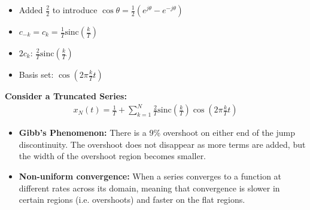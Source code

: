 \begin{example}
    \begin{itemize}
        \item Added \(\frac{2}{2}\) to introduce \(\cos\theta = \frac{1}{2} \left(e^{j \theta} - e^{-j \theta}\right) \)
        \item $c_{-k} = c_k = \frac{1}{T} \text{sinc} \left( \frac{k}{T} \right)$
        \item \(2c_k\): $\frac{2}{T} \text{sinc} \left( \frac{k}{T} \right)$
        \item Basis set: $\cos \left( 2\pi \frac{k}{T} t \right)$
    \end{itemize}
    \vspace{1em}
    
    \textbf{Consider a Truncated Series:}
    \begin{align*}
        x_N(t) = \frac{1}{T} + \sum_{k=1}^{N} \frac{2}{T} \text{sinc} \left( \frac{k}{T} \right) \cos \left( 2\pi \frac{k}{T} t \right)
    \end{align*}
    

    \begin{itemize}
        \item \textbf{Gibb's Phenomenon:} There is a 9\% overshoot on either end of the jump discontinuity. The overshoot does not disappear as more terms are added, but the width of the overshoot region becomes smaller.
        \item \textbf{Non-uniform convergence:} When a series converges to a function at different rates across its domain, meaning that convergence is slower in certain regions (i.e. overshoots) and faster on the flat regions. 
    \end{itemize}
\end{example}